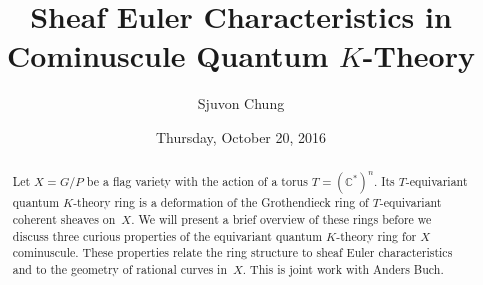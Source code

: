 \documentclass{UAmathtalk}
\author{Sjuvon Chung}
\title{Sheaf Euler Characteristics in Cominuscule Quantum $K$-Theory}
\date{Thursday, October 20, 2016}
\begin{document}
\maketitle

\begin{abstract}
Let $X = G/P$ be a flag variety with the action of a torus $T = (\mathbb{C}^{\ast})^n$.  Its $T$-equivariant quantum $K$-theory ring is a deformation of the Grothendieck ring of $T$-equivariant coherent sheaves on~$X$.  We will present a brief overview of these rings before we discuss three curious properties of the equivariant quantum $K$-theory ring for $X$ cominuscule.  These properties relate the ring structure to sheaf Euler characteristics and to the geometry of rational curves in~$X$.  This is joint work with Anders Buch.
\end{abstract}
\end{document}
